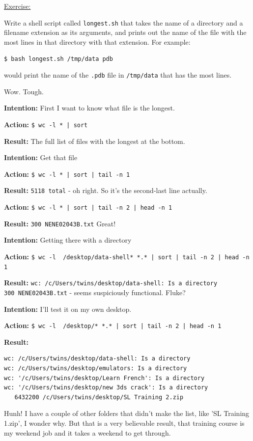 \documentclass[12pt]{article}
\begin{document}
\newpage\begin{addmargin}[1cm]{0cm}
\color{gray}
\underline{Exercise:}

Write a shell script called \texttt{longest.sh} that takes the name of a directory and a filename extension as its arguments, and prints out the name of the file with the most lines in that directory with that extension. For example:

\texttt{\$ bash longest.sh /tmp/data pdb} 

would print the name of the \texttt{.pdb} file in \texttt{/tmp/data} that has the most lines.

\vspace{1em}
\color{black}
Wow. Tough. 

\textbf{Intention:} First I want to know what file is the longest.

\textbf{Action:} \texttt{\$ wc -l * | sort}

\textbf{Result:} The full list of files with the longest at the bottom.

\vspace{1em}
\textbf{Intention:} Get that file

\textbf{Action:} \texttt{\$ wc -l * | sort | tail -n 1}

\textbf{Result:} \texttt{5118 total} 
- oh right. So it's the second-last line actually.

\textbf{Action:} \texttt{\$ wc -l * | sort | tail -n 2 | head -n 1}

\textbf{Result:} \texttt{300 NENE02043B.txt} 
Great!

\vspace{1em}
\textbf{Intention:} Getting there with a directory

\textbf{Action:} \texttt{\$ wc -l ~/desktop/data-shell* *.* | sort | tail -n 2 | head -n 1
}

\textbf{Result:} \texttt{wc: /c/Users/twins/desktop/data-shell: Is a directory
\\    300 NENE02043B.txt} - seems suspiciously functional. Fluke? 

\vspace{1em}
\textbf{Intention:} I'll test it on my own desktop.

\textbf{Action:} \texttt{\$ wc -l ~/desktop/* *.* | sort | tail -n 2 | head -n 1
}

\textbf{Result:}
\vspace{-1em}\begin{verbatim}
wc: /c/Users/twins/desktop/data-shell: Is a directory
wc: /c/Users/twins/desktop/emulators: Is a directory
wc: '/c/Users/twins/desktop/Learn French': Is a directory
wc: '/c/Users/twins/desktop/new 3ds crack': Is a directory
   6432200 /c/Users/twins/desktop/SL Training 2.zip
\end{verbatim}\vspace{-1em}
Hunh! I have a couple of other folders that didn't make the list, like 'SL Training 1.zip', I wonder why. But that is a very believable result, that training course is my weekend job and it takes a weekend to get through.


\end{addmargin}
\end{document}

